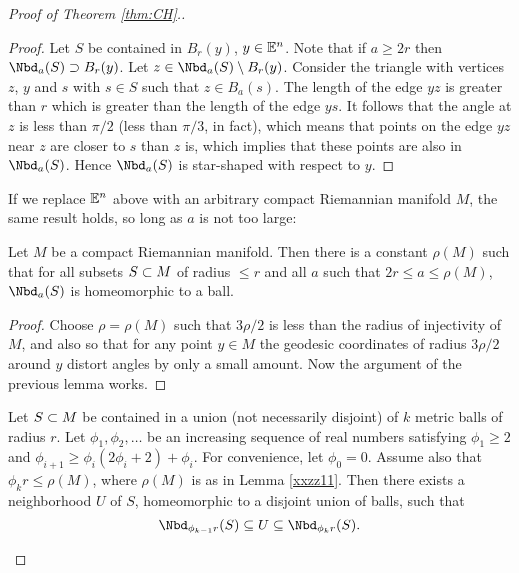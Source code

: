 {\begin{proof}[Proof of Theorem \ref{thm:CH}.]
\begin{proof} \label{xxyy2}
Let $S$ be contained in $B_r(y)$, $y \in \mathbb{E}^n$.
Note that if $a \ge 2r$ then $\Nbd_a(S) \sup B_r(y)$.
Let $z\in \Nbd_a(S) \setmin B_r(y)$.
Consider the triangle
with vertices $z$, $y$ and $s$ with $s\in S$ such that $z \in B_a(s)$.
The length of the edge $yz$ is greater than $r$ which is greater
than the length of the edge $ys$.
It follows that the angle at $z$ is less than $\pi/2$ (less than $\pi/3$, in fact),
which means that points on the edge $yz$ near $z$ are closer to $s$ than $z$ is,
which implies that these points are also in $\Nbd_a(S)$.
Hence $\Nbd_a(S)$ is star-shaped with respect to $y$.
\end{proof}

If we replace $\mathbb{E}^n$ above with an arbitrary compact Riemannian manifold $M$,
the same result holds, so long as $a$ is not too large:

\begin{lemma} \label{xxzz11}
Let $M$ be a compact Riemannian manifold.
Then there is a constant $\rho(M)$ such that for all
subsets $S\subset M$ of radius $\le r$ and all $a$ such that $2r \le a \le \rho(M)$,
$\Nbd_a(S)$ is homeomorphic to a ball.
\end{lemma}

\begin{proof}
Choose $\rho = \rho(M)$ such that $3\rho/2$ is less than the radius of injectivity of $M$,
and also so that for any point $y\in M$ the geodesic coordinates of radius $3\rho/2$ around
$y$ distort angles by only a small amount.
Now the argument of the previous lemma works.
\end{proof}



\begin{lemma} \label{xx2phi}
Let $S \subset M$ be contained in a union (not necessarily disjoint)
of $k$ metric balls of radius $r$.
Let $\phi_1, \phi_2, \ldots$ be an increasing sequence of real numbers satisfying
$\phi_1 \ge 2$ and $\phi_{i+1} \ge \phi_i(2\phi_i + 2) + \phi_i$.
For convenience, let $\phi_0 = 0$.
Assume also that $\phi_k r \le \rho(M)$,
where $\rho(M)$ is as in Lemma \ref{xxzz11}.
Then there exists a neighborhood $U$ of $S$,
homeomorphic to a disjoint union of balls, such that
\[
	\Nbd_{\phi_{k-1} r}(S) \subeq U \subeq \Nbd_{\phi_k r}(S) .
\]
\end{lemma}


\end{proof}}
